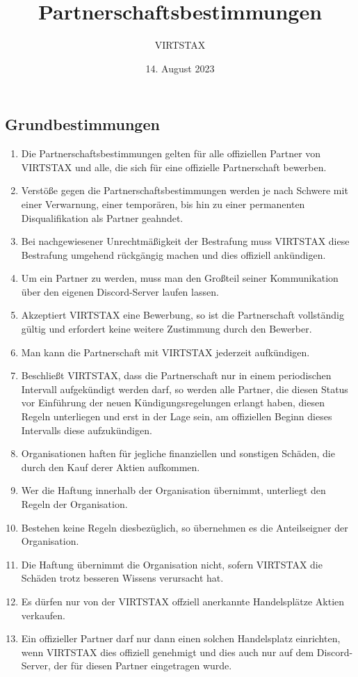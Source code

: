 \documentclass{article}
\title{Partnerschaftsbestimmungen}
\author{VIRTSTAX}
\date{14. August 2023}
\begin{document}
\maketitle
\newpage
\tableofcontents
\newpage
\subsection{Grundbestimmungen}\label{grundb}
\begin{enumerate}[(1)]
	\item Die Partnerschaftsbestimmungen gelten für alle offiziellen Partner von VIRTSTAX und alle, die sich für eine offizielle Partnerschaft bewerben.
	\item Verstöße gegen die Partnerschaftsbestimmungen werden je nach Schwere mit einer Verwarnung, einer temporären, bis hin zu einer permanenten Disqualifikation als Partner geahndet.
	\item Bei nachgewiesener Unrechtmäßigkeit der Bestrafung muss VIRTSTAX diese Bestrafung umgehend rückgängig machen und dies offiziell ankündigen.
	\item Um ein Partner zu werden, muss man den Großteil seiner Kommunikation über den eigenen Discord-Server laufen lassen. 
	\item Akzeptiert VIRTSTAX eine Bewerbung, so ist die Partnerschaft vollständig gültig und erfordert keine weitere Zustimmung durch den Bewerber.
	\item Man kann die Partnerschaft mit VIRTSTAX jederzeit aufkündigen.
	\item Beschließt VIRTSTAX, dass die Partnerschaft nur in einem periodischen Intervall aufgekündigt werden darf, so werden alle Partner, die diesen Status vor Einführung der neuen Kündigungsregelungen erlangt haben, diesen Regeln unterliegen und erst in der Lage sein, am offiziellen Beginn dieses Intervalls diese aufzukündigen.
	\item Organisationen haften für jegliche finanziellen und sonstigen Schäden, die durch den Kauf derer Aktien aufkommen.
	\item Wer die Haftung innerhalb der Organisation übernimmt, unterliegt den Regeln der Organisation.
	\item Bestehen keine Regeln diesbezüglich, so übernehmen es die Anteilseigner der Organisation.
	\item Die Haftung übernimmt die Organisation nicht, sofern VIRTSTAX die Schäden trotz besseren Wissens verursacht hat.
	\item Es dürfen nur von der VIRTSTAX offziell anerkannte Handelsplätze Aktien verkaufen.
	\item Ein offizieller Partner darf nur dann einen solchen Handelsplatz einrichten, wenn VIRTSTAX dies offiziell genehmigt und dies auch nur auf dem Discord-Server, der für diesen Partner eingetragen wurde.
\end{enumerate}
\end{document}
